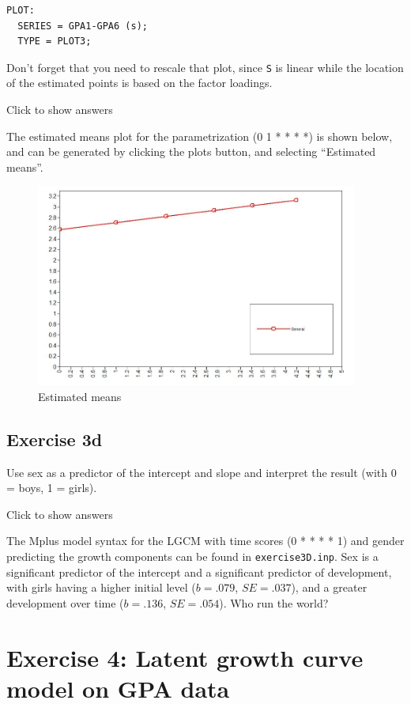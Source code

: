 \documentclass[
]{book}
\begin{document}
\begin{verbatim}
PLOT: 
  SERIES = GPA1-GPA6 (s); 
  TYPE = PLOT3;
\end{verbatim}

Don't forget that you need to rescale that plot, since \texttt{S} is linear while the location of the estimated points is based on the factor loadings.

Click to show answers

The estimated means plot for the parametrization (0 1 * * * *) is shown below, and can be generated by clicking the plots button, and selecting ``Estimated means''.

\begin{figure}
\centering
\includegraphics[width=4.16667in,height=\textheight]{./figures/exercise3C-estimatedMeans.jpg}
\caption{Estimated means}
\end{figure}

\hypertarget{exercise-3d}{%
\subsection{Exercise 3d}\label{exercise-3d}}

Use sex as a predictor of the intercept and slope and interpret the result (with 0 = boys, 1 = girls).

Click to show answers

The Mplus model syntax for the LGCM with time scores (0 * * * * 1) and gender predicting the growth components can be found in \texttt{exercise3D.inp}. Sex is a significant predictor of the intercept and a significant predictor of development, with girls having a higher initial level (\(b = .079\), \(SE = .037\)), and a greater development over time (\(b = .136\), \(SE = .054\)). Who run the world?

\hypertarget{exercise-4-latent-growth-curve-model-on-gpa-data}{%
\section{Exercise 4: Latent growth curve model on GPA data}\label{exercise-4-latent-growth-curve-model-on-gpa-data}}
\end{document}
